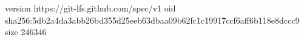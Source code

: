 version https://git-lfs.github.com/spec/v1
oid sha256:5db2a4da3abb26bd355d25eeb63dbaa09b62fc1c19917ccf6aff6b118e8dccc9
size 246346
